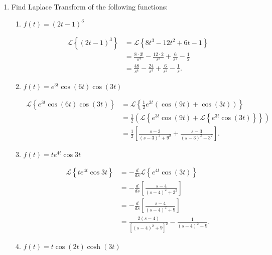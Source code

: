 \documentclass{zc-ust-hw}
\renewcommand{\L}[1]{\mathscr{L}\left\{#1\right\}}
\begin{document}
\maketitle

\begin{enumerate}
  \item Find Laplace Transform of the following functions:
    \begin{enumerate}
      \item $f(t)=(2 t-1)^3$
        \begin{sol}
          \begin{align}
            \L{(2 t-1)^3} &= \L{8 t^3 - 12 t^2 + 6 t - 1} \\
            &= \frac{8\cdot 3!}{s^{4} }-\frac{12\cdot 2}{s^3 }+\frac{6}{s^2}-\frac{1}{2} \\
            &= \frac{48}{s^{4} }-\frac{24}{s^3 }+\frac{6}{s^2}-\frac{1}{s}
          .\end{align}
        \end{sol}
      \item $f(t)=e^{3 t} \cos (6 t) \cos (3 t)$
        \begin{sol}
          \begin{align}
            \L{e^{3 t} \cos (6 t) \cos (3 t)} &= \L{\frac{1}{2}e^{3 t}\left( \cos (9t) + \cos (3t) \right) } \\
            &= \frac{1}{2}\left( \L{e^{3t}\cos(9t) + \L{e^{3t}\cos (3t) } } \right) \\
            &= \frac{1}{2} \left[ \frac{s-3}{(s-3)^2+9^2}+\frac{s-3}{(s-3)^2+3^2} \right]
          .\end{align}
        \end{sol}
      \item $f(t)=t e^{4 t} \cos 3 t$
        \begin{sol}
          \begin{align}
            \L{t e^{4 t} \cos 3 t} &= -\frac{d}{ds}\L{e^{4t}\cos(3t)} \\
            &= -\frac{d}{ds}\left[ \frac{s-4}{(s-4)^2+3^2} \right] \\
            &= -\frac{d}{ds}\left[ \frac{s-4}{(s-4)^2+9} \right] \\
            &= \frac{2(s-4)}{\left[ (s-4)^2+9 \right]^2}-\frac{1}{(s-4)^2+9}
          .\end{align}
        \end{sol}
        \newpage
      \item $f(t)=t \cos (2 t) \cosh (3 t)$
        \begin{sol}

\end{sol}
\end{enumerate}
\end{enumerate}
\end{document}
